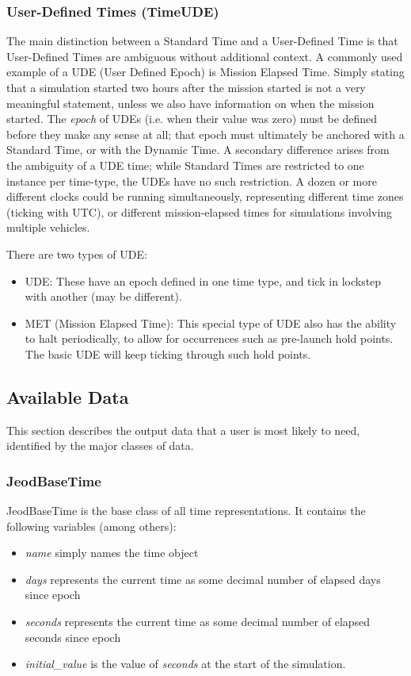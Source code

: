 \subsubsection[User-Defined Times (TimeUDE)]{User-Defined Times (TimeUDE)}
The main distinction between a Standard Time and a User-Defined Time is
that User-Defined Times are ambiguous without additional context.  A
commonly used example of a UDE (User Defined Epoch) is Mission Elapsed
Time.  Simply stating that a simulation started two hours after the
mission started is not a very meaningful statement, unless we also have
information on when the mission started.  The \textit{epoch} of UDEs
(i.e. when their value was zero) must be defined before they make any
sense at all; that epoch must ultimately be anchored with a Standard
Time, or with the Dynamic Time.  A secondary difference arises from the
ambiguity of a UDE time; while Standard Times are restricted to one
instance per time-type, the UDEs have no such restriction.  A dozen or
more different clocks could be running simultaneously, representing
different time zones (ticking with UTC), or different mission-elapsed
times for simulations involving multiple vehicles.

There are two types of UDE:


\begin{itemize}
\item UDE:  These have an epoch defined in one time type, and tick in
lockstep with another (may be different).
\item MET (Mission Elapsed Time):  This special type of UDE also has the
ability to halt periodically, to allow for occurrences such as
pre-launch hold points.  The basic UDE will keep ticking through such
hold points.
\end{itemize}



\subsection{Available Data}
This section describes the output data that a user is most likely to
need, identified by the major classes of data.

\subsubsection{JeodBaseTime}
JeodBaseTime is the base class of all time representations.  It contains the
following variables (among others):

\begin{itemize}
\item {\textit{name}} simply names the time object
\item {\textit{days}} represents the current time as some decimal number of elapsed days since epoch
\item {\textit{seconds}} represents the current time as some decimal number of elapsed seconds since epoch
\item {\textit{initial\_value}} is the value of \textit{seconds} at the start of the simulation.
\end{itemize}

